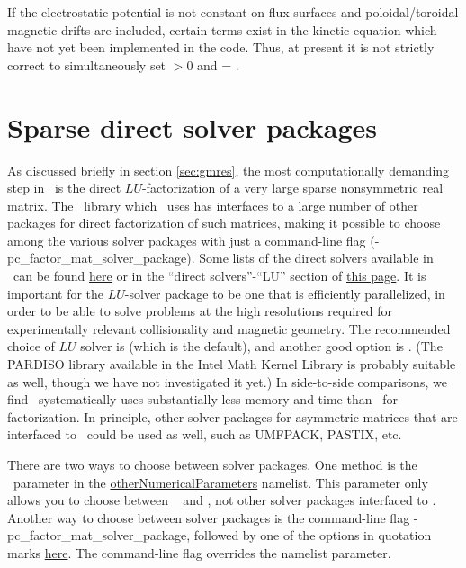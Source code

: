 If the electrostatic potential is not constant on flux surfaces and poloidal/toroidal magnetic drifts
are included, certain terms exist in the kinetic equation which have not yet been implemented in the code.
Thus, at present it is not strictly correct to simultaneously set   $> 0$ 
and   = \true.

\section{Sparse direct solver packages}
\label{sec:solvers}

As discussed briefly in section \ref{sec:gmres}, the most computationally demanding step in 
\sfincs~is the direct $LU$-factorization of a very large sparse nonsymmetric real matrix. The \PETSc~library
which \sfincs~uses has interfaces to a large number of other packages for direct factorization of such matrices,
making it possible to choose among the various solver packages with just a command-line flag ({\ttfamily -pc\_factor\_mat\_solver\_package}).  Some lists of the direct solvers
available in \PETSc~can be found \href{http://www.mcs.anl.gov/petsc/petsc-current/docs/manualpages/Mat/MatSolverPackage.html#MatSolverPackage}{here}
or in the ``direct solvers''-``LU'' section of \href{http://www.mcs.anl.gov/petsc/documentation/linearsolvertable.html}{this page}.
It is important for the $LU$-solver package to be one that is efficiently parallelized, 
in order to be able to solve problems at the high resolutions required for experimentally relevant collisionality and magnetic geometry.
The recommended choice of $LU$ solver is \href{http://mumps-solver.org/}{\mumps} (which is the default), and another good option is \href{http://crd-legacy.lbl.gov/~xiaoye/SuperLU/}{\superludist}.
(The {\ttfamily PARDISO} library available in the Intel Math Kernel Library is probably suitable as well, though we have not investigated it yet.)
In side-to-side comparisons, we find \mumps~systematically uses substantially less memory and time than \superludist~for factorization.
In principle, other solver packages for asymmetric matrices that are interfaced to \PETSc~could be used as well, such as {\ttfamily UMFPACK}, {\ttfamily PASTIX}, etc.

There are two ways to choose between solver packages.
One method is the \sfincs~parameter  in the 
{\ttfamily \hyperref[sec:otherNumericalParameters]{otherNumericalParameters}} namelist.
This parameter only allows you to choose between \mumps~ and \superludist, not other solver packages interfaced to \PETSc.
Another way to choose between solver packages is the command-line flag {\ttfamily -pc\_factor\_mat\_solver\_package},
followed by one of the options in quotation marks \href{http://www.mcs.anl.gov/petsc/petsc-current/docs/manualpages/Mat/MatSolverPackage.html#MatSolverPackage}{here}.
The command-line flag overrides the namelist parameter.

